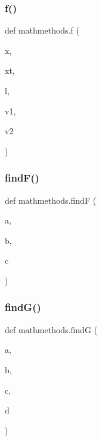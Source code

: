 \mbox{\label{namespacemathmethods_ac945e4655c6b407054fa4553f05f50ef}} 
\subsubsection{\texorpdfstring{f()}{f()}}
{\footnotesize\ttfamily def mathmethods.\+f (\begin{DoxyParamCaption}\item[{}]{x,  }\item[{}]{xt,  }\item[{}]{l,  }\item[{}]{v1,  }\item[{}]{v2 }\end{DoxyParamCaption})}

\mbox{\label{namespacemathmethods_a30cb2db3d58d8972704dd5e4af463a5f}} 
\subsubsection{\texorpdfstring{find\+F()}{findF()}}
{\footnotesize\ttfamily def mathmethods.\+findF (\begin{DoxyParamCaption}\item[{}]{a,  }\item[{}]{b,  }\item[{}]{c }\end{DoxyParamCaption})}

\mbox{\label{namespacemathmethods_a22816e0deeb8aeb5093ee56c40a2f0ed}} 
\subsubsection{\texorpdfstring{find\+G()}{findG()}}
{\footnotesize\ttfamily def mathmethods.\+findG (\begin{DoxyParamCaption}\item[{}]{a,  }\item[{}]{b,  }\item[{}]{c,  }\item[{}]{d }\end{DoxyParamCaption})}

